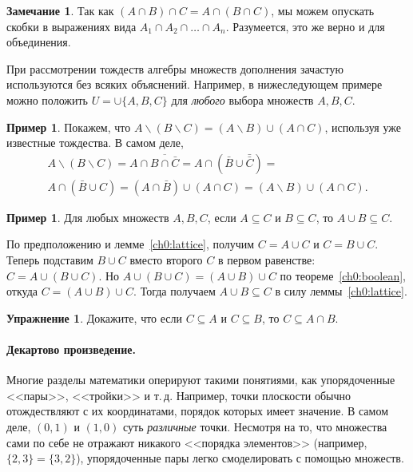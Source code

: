 \documentclass[12pt,notitlepage]{article}
\theoremstyle{plain}
\theoremstyle{definition}
\newtheorem{exc}[thm]{Упражнение}
\newtheorem{exm}[thm]{Пример}
\newtheorem{rem}[thm]{Замечание}
\theoremstyle{plain}
\newcommand{\sbs}{\subseteq}
\renewcommand{\setminus}{\smallsetminus}
\newcommand{\1}{\mathbf{1}}
\newcommand{\0}{\mathbf{0}}
\begin{document}
\begin{rem}
	Так как $(A \cap B) \cap C = A \cap (B \cap C)$, мы можем опускать скобки в выражениях вида $A_1 \cap A_2 \cap \ldots \cap A_n$. Разумеется, это же верно и для объединения.
\end{rem}

При рассмотрении тождеств алгебры множеств дополнения зачастую используются без всяких объяснений. Например, в нижеследующем примере можно положить $U = \cup\{A, B, C\}$ для \emph{любого} выбора множеств $A, B, C$.

\begin{exm}
	Покажем, что $A \setminus (B \setminus C) = (A \setminus B) \cup (A \cap C)$, используя уже известные тождества. В самом деле,
	\begin{multline*}
		A \setminus (B \setminus C) = A \cap \overline{B \cap \bar C} = A \cap (\bar B \cup \bar{\bar C}) =\\
		A \cap (\bar B \cup C) = (A \cap \bar B) \cup (A \cap C) = (A \setminus B) \cup (A \cap C).
	\end{multline*}
\end{exm}

\begin{exm}\label{L2:cup_sup}
	Для любых множеств $A, B, C$, если $A \sbs C$ и $B \sbs C$, то $A \cup B \sbs C$.
	
	По предположению и лемме~\ref{ch0:lattice}, получим $C = A \cup C$ и $C = B \cup C$. Теперь подставим $B \cup C$ вместо второго $C$ в первом равенстве: $C = A \cup (B \cup C)$. Но $A \cup (B \cup C) = (A \cup B) \cup C$ по теореме~\ref{ch0:boolean}, откуда $C = (A \cup B) \cup C$. Тогда получаем $A \cup B \sbs C$ в силу леммы~\ref{ch0:lattice}.
\end{exm}

\begin{exc}
	Докажите, что если $C \sbs A$ и $C \sbs B$, то $C \sbs A \cap B$.
\end{exc}

\paragraph{Декартово произведение.} Многие разделы математики оперируют такими понятиями, как упорядоченные <<пары>>, <<тройки>> и т.\,д. Например, точки плоскости обычно отождествляют с их координатами, порядок которых имеет значение. В самом деле, $(0,1)$ и $(1,0)$ суть \emph{различные} точки. Несмотря на то, что множества сами по себе не отражают никакого <<порядка элементов>> (например, $\{2,3\} = \{3,2\}$), упорядоченные пары легко смоделировать с помощью множеств.
\end{document}

